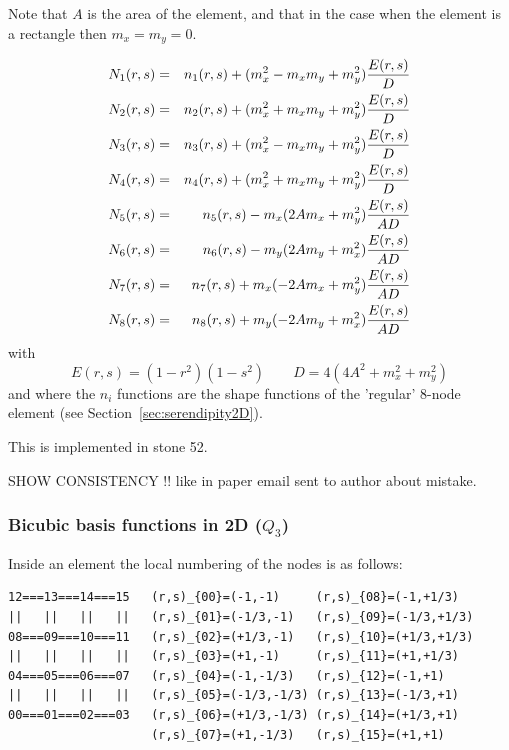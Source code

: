 Note that $A$ is the area of the element, and that in the case when 
the element is a rectangle then $m_x=m_y=0$.

\begin{eqnarray}
N_1(r,s)&=& n_1(r,s) +(m_x^2 - m_xm_y + m_y^2)\frac{E(r,s)}{D} \nonumber\\
N_2(r,s)&=& n_2(r,s) +(m_x^2 + m_xm_y + m_y^2)\frac{E(r,s)}{D} \nonumber\\
N_3(r,s)&=& n_3(r,s) +(m_x^2 - m_xm_y + m_y^2)\frac{E(r,s)}{D} \nonumber\\
N_4(r,s)&=& n_4(r,s) +(m_x^2 + m_xm_y + m_y^2)\frac{E(r,s)}{D} \nonumber\\
N_5(r,s)&=& n_5(r,s) -m_x(2Am_x+m_y^2)\frac{E(r,s)}{AD} \nonumber\\
N_6(r,s)&=& n_6(r,s) -m_y(2Am_y+m_x^2)\frac{E(r,s)}{AD} \nonumber\\
N_7(r,s)&=& n_7(r,s) +m_x(-2Am_x+m_y^2)\frac{E(r,s)}{AD} \nonumber\\
N_8(r,s)&=& n_8(r,s) +m_y(-2Am_y+m_x^2)\frac{E(r,s)}{AD} \nonumber
\end{eqnarray}
with 
\[
E(r,s)=(1-r^2)(1-s^2)
\qquad
D=4(4A^2+m_x^2+m_y^2)
\]
and where the $n_i$ functions are the shape functions of the 'regular' 
8-node element (see Section~\ref{sec:serendipity2D}).

This is implemented in stone 52.

SHOW CONSISTENCY !! like in paper
email sent to author about mistake.  















\subsubsection{Bicubic basis functions in 2D ($Q_3$)}

Inside an element the local numbering of the nodes is as follows:
\begin{verbatim}
12===13===14===15   (r,s)_{00}=(-1,-1)     (r,s)_{08}=(-1,+1/3)  
||   ||   ||   ||   (r,s)_{01}=(-1/3,-1)   (r,s)_{09}=(-1/3,+1/3)
08===09===10===11   (r,s)_{02}=(+1/3,-1)   (r,s)_{10}=(+1/3,+1/3)
||   ||   ||   ||   (r,s)_{03}=(+1,-1)     (r,s)_{11}=(+1,+1/3)
04===05===06===07   (r,s)_{04}=(-1,-1/3)   (r,s)_{12}=(-1,+1)
||   ||   ||   ||   (r,s)_{05}=(-1/3,-1/3) (r,s)_{13}=(-1/3,+1)
00===01===02===03   (r,s)_{06}=(+1/3,-1/3) (r,s)_{14}=(+1/3,+1)
                    (r,s)_{07}=(+1,-1/3)   (r,s)_{15}=(+1,+1)
\end{verbatim}

